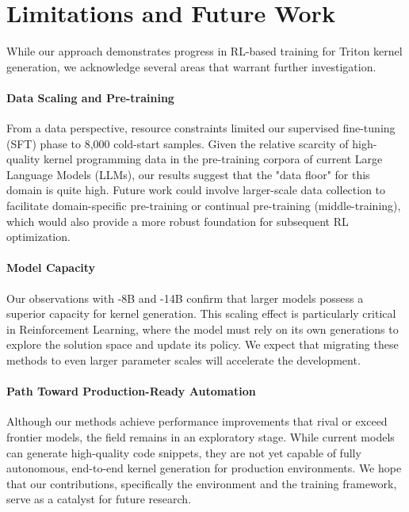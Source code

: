 \section{Limitations and Future Work}
While our approach demonstrates progress in RL-based training for Triton kernel generation, we acknowledge several areas that warrant further investigation.

\paragraph{Data Scaling and Pre-training}
From a data perspective, resource constraints limited our supervised fine-tuning (SFT) phase to 8,000 cold-start samples. Given the relative scarcity of high-quality kernel programming data in the pre-training corpora of current Large Language Models (LLMs), our results suggest that the "data floor" for this domain is quite high. Future work could involve larger-scale data collection to facilitate domain-specific pre-training or continual pre-training (middle-training), which would also provide a more robust foundation for subsequent RL optimization.

\paragraph{Model Capacity}
Our observations with -8B and -14B confirm that larger models possess a superior capacity for kernel generation. This scaling effect is particularly critical in Reinforcement Learning, where the model must rely on its own generations to explore the solution space and update its policy. We expect that migrating these methods to even larger parameter scales will accelerate the development.

\paragraph{Path Toward Production-Ready Automation}
Although our methods achieve performance improvements that rival or exceed frontier models, the field remains in an exploratory stage. While current models can generate high-quality code snippets, they are not yet capable of fully autonomous, end-to-end kernel generation for production environments. We hope that our contributions, specifically the \env{} environment and the  training framework, serve as a catalyst for future research.